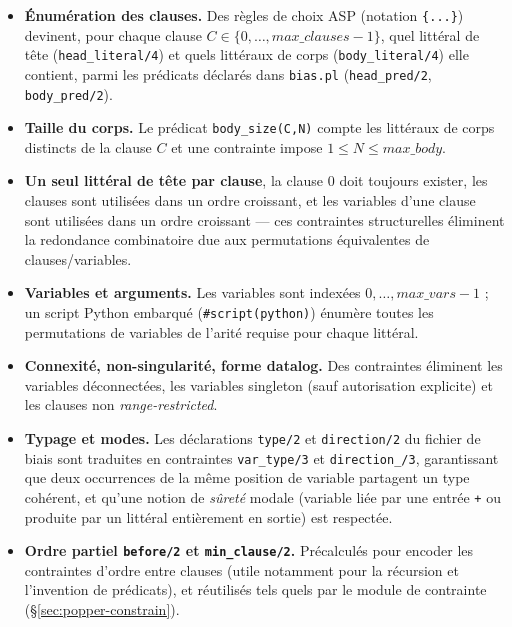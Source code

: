 \begin{itemize}
  \item \textbf{Énumération des clauses.} Des règles de choix ASP
    (notation \texttt{\{...\}}) devinent, pour chaque clause $C \in
    \{0, \dots, \mathit{max\_clauses}-1\}$, quel littéral de tête
    (\texttt{head\_literal/4}) et quels littéraux de corps
    (\texttt{body\_literal/4}) elle contient, parmi les prédicats
    déclarés dans \texttt{bias.pl} (\texttt{head\_pred/2},
    \texttt{body\_pred/2}).
  \item \textbf{Taille du corps.} Le prédicat \texttt{body\_size(C,N)}
    compte les littéraux de corps distincts de la clause $C$ et une
    contrainte impose $1 \le N \le \mathit{max\_body}$.
  \item \textbf{Un seul littéral de tête par clause}, la clause $0$
    doit toujours exister, les clauses sont utilisées dans un ordre
    croissant, et les variables d'une clause sont utilisées dans un
    ordre croissant --- ces contraintes structurelles éliminent la
    redondance combinatoire due aux permutations équivalentes de
    clauses/variables.
  \item \textbf{Variables et arguments.} Les variables sont indexées
    $0, \dots, \mathit{max\_vars}-1$ ; un script Python embarqué
    (\texttt{\#script(python)}) énumère toutes les permutations de
    variables de l'arité requise pour chaque littéral.
  \item \textbf{Connexité, non-singularité, forme datalog.} Des
    contraintes éliminent les variables déconnectées, les variables
    singleton (sauf autorisation explicite) et les clauses non
    \emph{range-restricted}.
  \item \textbf{Typage et modes.} Les déclarations \texttt{type/2} et
    \texttt{direction/2} du fichier de biais sont traduites en
    contraintes \texttt{var\_type/3} et \texttt{direction\_/3},
    garantissant que deux occurrences de la même position de variable
    partagent un type cohérent, et qu'une notion de \emph{sûreté}
    modale (variable liée par une entrée \texttt{+} ou produite par un
    littéral entièrement en sortie) est respectée.
  \item \textbf{Ordre partiel \texttt{before/2} et \texttt{min\_clause/2}.}
    Précalculés pour encoder les contraintes d'ordre entre clauses
    (utile notamment pour la récursion et l'invention de prédicats), et
    réutilisés tels quels par le module de contrainte
    (\S\ref{sec:popper-constrain}).
\end{itemize}


